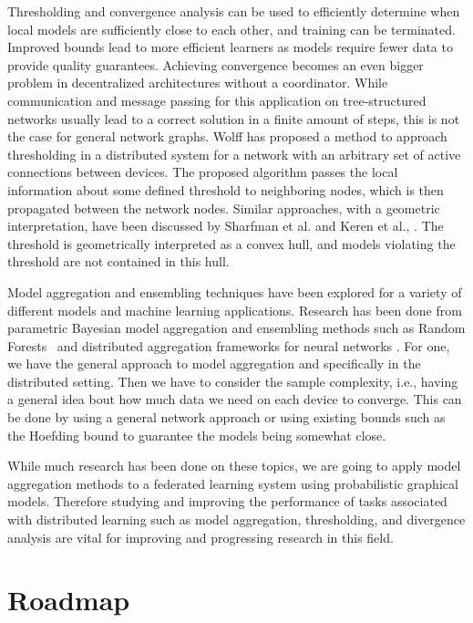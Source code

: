 Thresholding and convergence analysis can be used to efficiently determine when local models are sufficiently close to each other, and training can be terminated.
Improved bounds lead to more efficient learners as models require fewer data to provide quality guarantees.
Achieving convergence becomes an even bigger problem in decentralized architectures without a coordinator.
While communication and message passing for this application on tree-structured networks usually lead to a correct solution in a finite amount of steps, this is not the case for general network graphs.
Wolff \cite{wolff2013local} has proposed a method to approach thresholding in a distributed system for a network with an arbitrary set of active connections between devices.
The proposed algorithm passes the local information about some defined threshold to neighboring nodes, which is then propagated between the network nodes. 
Similar approaches, with a geometric interpretation, have been discussed by Sharfman et al. \cite{sharfman2007geometric} and Keren et al., \cite{keren2011shape}. 
The threshold is geometrically interpreted as a convex hull, and models violating the threshold are not contained in this hull. 

Model aggregation and ensembling techniques have been explored for a variety of different models and machine learning applications.
Research has been done from parametric Bayesian model aggregation \cite{hoeting1999bayesian}\cite{de2011bayesian} and ensembling methods such as Random Forests~\cite{breiman2001random} and distributed aggregation frameworks for neural networks \cite{mcmahan2016communication}.
For one, we have the general approach to model aggregation and specifically in the distributed setting.
Then we have to consider the sample complexity, i.e., having a general idea bout how much data we need on each device to converge.
This can be done by using a general network approach or using existing bounds such as the Hoefding bound to guarantee the models being somewhat close.

While much research has been done on these topics, we are going to apply model aggregation methods to a federated learning system using probabilistic graphical models.
Therefore studying and improving the performance of tasks associated with distributed learning such as model aggregation, thresholding, and divergence analysis are vital for improving and progressing research in this field.

\section{Roadmap}

